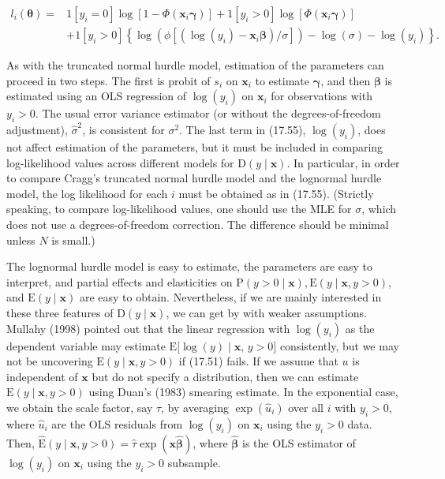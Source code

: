 \documentclass[10pt]{article}
\begin{document}
\begin{align*}
l_{i}(\boldsymbol{\theta})= & 1\left[y_{i}=0\right] \log \left[1-\Phi\left(\mathbf{x}_{i} \boldsymbol{\gamma}\right)\right]+1\left[y_{i}>0\right] \log \left[\Phi\left(\mathbf{x}_{i} \boldsymbol{\gamma}\right)\right] \\
& +1\left[y_{i}>0\right]\left\{\log \left(\phi\left[\left(\log \left(y_{i}\right)-\mathbf{x}_{i} \boldsymbol{\beta}\right) / \sigma\right]\right)-\log (\sigma)-\log \left(y_{i}\right)\right\} . \tag{17.55}
\end{align*}


As with the truncated normal hurdle model, estimation of the parameters can proceed in two steps. The first is probit of $s_{i}$ on $\mathbf{x}_{i}$ to estimate $\boldsymbol{\gamma}$, and then $\boldsymbol{\beta}$ is estimated using an OLS regression of $\log \left(y_{i}\right)$ on $\mathbf{x}_{i}$ for observations with $y_{i}>0$. The usual error variance estimator (or without the degrees-of-freedom adjustment), $\hat{\sigma}^{2}$, is consistent for $\sigma^{2}$. The last term in (17.55), $\log \left(y_{i}\right)$, does not affect estimation of the parameters, but it must be included in comparing log-likelihood values across different models for $\mathrm{D}(y \mid \mathbf{x})$. In particular, in order to compare Cragg's truncated normal hurdle model and the lognormal hurdle model, the log likelihood for each $i$ must be obtained as in (17.55). (Strictly speaking, to compare log-likelihood values, one should use the MLE for $\sigma$, which does not use a degrees-of-freedom correction. The difference should be minimal unless $N$ is small.)

The lognormal hurdle model is easy to estimate, the parameters are easy to interpret, and partial effects and elasticities on $\mathrm{P}(y>0 \mid \mathbf{x}), \mathrm{E}(y \mid \mathbf{x}, y>0)$, and $\mathrm{E}(y \mid \mathbf{x})$ are easy to obtain. Nevertheless, if we are mainly interested in these three features of $\mathrm{D}(y \mid \mathbf{x})$, we can get by with weaker assumptions. Mullahy (1998) pointed out that the linear regression with $\log \left(y_{i}\right)$ as the dependent variable may estimate $\mathrm{E}[\log (y) \mid \mathbf{x}$, $y>0]$ consistently, but we may not be uncovering $\mathrm{E}(y \mid \mathbf{x}, y>0)$ if (17.51) fails. If we assume that $u$ is independent of $\mathbf{x}$ but do not specify a distribution, then we can estimate $\mathrm{E}(y \mid \mathbf{x}, y>0)$ using Duan's (1983) smearing estimate. In the exponential case, we obtain the scale factor, say $\hat{\tau}$, by averaging $\exp \left(\hat{u}_{i}\right)$ over all $i$ with $y_{i}>0$, where $\hat{u}_{i}$ are the OLS residuals from $\log \left(y_{i}\right)$ on $\mathbf{x}_{i}$ using the $y_{i}>0$ data. Then, $\hat{\mathrm{E}}(y \mid \mathbf{x}, y>0)=\hat{\tau} \exp (\mathbf{x} \hat{\boldsymbol{\beta}})$, where $\hat{\boldsymbol{\beta}}$ is the OLS estimator of $\log \left(y_{i}\right)$ on $\mathbf{x}_{i}$ using the $y_{i}>0$ subsample.
\end{document}
